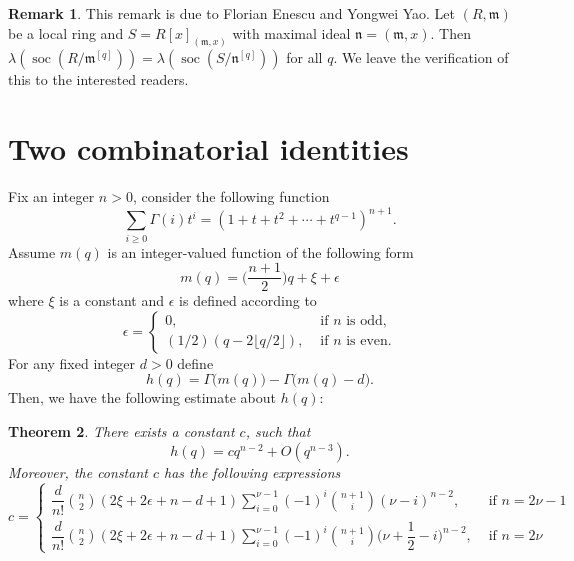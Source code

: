 \documentclass[draft]{amsart}
\newtheorem{theorem}{Theorem}[section]
\theoremstyle{definition}
\newtheorem{remark}[theorem]{Remark}
\numberwithin{equation}{theorem}
\begin{document}
\begin{remark} This remark is due to Florian Enescu and Yongwei Yao. Let $(R, {\mathfrak{m}})$ be a local ring and $S=R[x]_{({\mathfrak{m}}, x)}$ with maximal ideal ${\mathfrak{n}}=({\mathfrak{m}}, x)$. Then
${\lambda} ({\operatorname{soc}}(R/{\mathfrak{m}}^{[q]}))= {\lambda} ({\operatorname{soc}}(S/{\mathfrak{n}}^{[q]}))$
for all $q$. We leave the verification of this to the interested readers.
\end{remark}

\section{Two combinatorial identities}\label{cl}
 

Fix an integer $n>0$, consider the following function
\begin{equation}\label{genfun}
\sum_{i\geq 0} {{\Gamma}} (i)t^i =(1+t+t^2+\cdots+t^{q-1})^{n+1}.
\end{equation} 
Assume  $m(q)$ is an integer-valued function of the following form
\[m(q)=\bigg(\dfrac{n+1}{2}\bigg )q+\xi + \epsilon\]
where $\xi$ is a constant and $\epsilon$ is defined according to
\begin{displaymath}
   \epsilon = \left\{
     \begin{array}{lr}
       0,& \text{ if  $n$ is odd,}\\
    (1/2)(q-2\lfloor{q/2}\rfloor),& \text{ if  $n$ is even.}
     \end{array}
   \right.
\end{displaymath} 
For any fixed integer $d>0$ define
\begin{equation}
h(q)={{\Gamma}} \bigg(m(q) \bigg)-{{\Gamma}} \bigg(m(q)-d \bigg).
\end{equation}
Then,  we have the following estimate about $h(q)$:
\begin{theorem}\label{elementary}
There exists a constant $c$, such that
 \[h(q)=cq^{n-2}+O(q^{n-3}).\]
Moreover, the constant $c$ has the following expressions
\begin{displaymath}
   c = \left\{
     \begin{array}{lr}
       \dfrac{d}{n!}{n \choose 2} (2\xi+2\epsilon+n-d+1) \sum_{i=0}^{\nu-1} (-1)^i {{n+1} \choose i} (\nu-i)^{n-2},& \text{ if } n=2\nu-1\\
      \dfrac{d}{n!}{n \choose 2} (2\xi+2\epsilon+n-d+1) \sum_{i=0}^{\nu-1} (-1)^i {{n+1} \choose i} \bigg (\nu+\dfrac{1}{2}-i\bigg)^{n-2} ,& \text{ if } n=2\nu
     \end{array}
   \right.
\end{displaymath} 
\end{theorem} 
\end{document}
